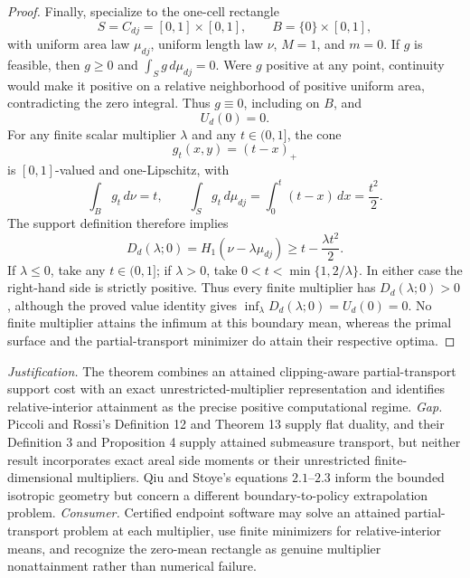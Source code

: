 \documentclass{article}
\begin{document}
\begin{proof}
Finally, specialize to the one-cell rectangle
\[
 S=C_{dj}=[0,1]\times[0,1],
 \qquad
 B=\{0\}\times[0,1],
\]
with uniform area law \(\mu_{dj}\), uniform length law \(\nu\), \(M=1\), and \(m=0\).  If \(g\) is feasible, then \(g\geq0\) and \(\int_Sg\,d\mu_{dj}=0\).  Were \(g\) positive at any point, continuity would make it positive on a relative neighborhood of positive uniform area, contradicting the zero integral.  Thus \(g\equiv0\), including on \(B\), and
\[
 U_d(0)=0.
\]
For any finite scalar multiplier \(\lambda\) and any \(t\in(0,1]\), the cone
\[
 g_t(x,y)=(t-x)_+
\]
is \([0,1]\)-valued and one-Lipschitz, with
\[
 \int_Bg_t\,d\nu=t,
 \qquad
 \int_Sg_t\,d\mu_{dj}
 =\int_0^t(t-x)\,dx
 =\frac{t^2}{2}.
\]
The support definition therefore implies
\[
 D_d(\lambda;0)=H_1(\nu-\lambda\mu_{dj})
 \geq t-\frac{\lambda t^2}{2}.
\]
If \(\lambda\leq0\), take any \(t\in(0,1]\); if \(\lambda>0\), take \(0<t<\min\{1,2/\lambda\}\).  In either case the right-hand side is strictly positive.  Thus every finite multiplier has \(D_d(\lambda;0)>0\), although the proved value identity gives \(\inf_\lambda D_d(\lambda;0)=U_d(0)=0\).  No finite multiplier attains the infimum at this boundary mean, whereas the primal surface and the partial-transport minimizer do attain their respective optima.
\end{proof}
\par\smallskip\noindent \textit{Justification.} The theorem combines an attained clipping-aware partial-transport support cost with an exact unrestricted-multiplier representation and identifies relative-interior attainment as the precise positive computational regime. \textit{Gap.} Piccoli and Rossi's Definition 12 and Theorem 13 supply flat duality, and their Definition 3 and Proposition 4 supply attained submeasure transport, but neither result incorporates exact areal side moments or their unrestricted finite-dimensional multipliers. Qiu and Stoye's equations \(2.1\)--\(2.3\) inform the bounded isotropic geometry but concern a different boundary-to-policy extrapolation problem. \textit{Consumer.} Certified endpoint software may solve an attained partial-transport problem at each multiplier, use finite minimizers for relative-interior means, and recognize the zero-mean rectangle as genuine multiplier nonattainment rather than numerical failure.
\end{document}
